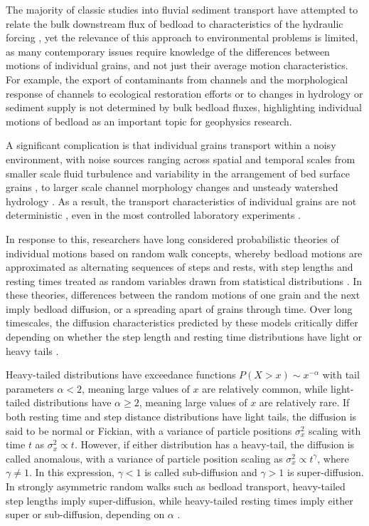 \documentclass[draft]{agujournal2018}
\begin{document}
The majority of classic studies into fluvial sediment transport have attempted to relate the bulk downstream flux of bedload to characteristics of the hydraulic forcing \citep[e.g.][]{Yalin1972}, yet the relevance of this approach to environmental problems is limited, as many contemporary issues require knowledge of the differences between motions of individual grains, and not just their average motion characteristics.
For example, the export of contaminants from channels \citep[e.g.][]{Malmon2005} and the morphological response of channels to ecological restoration efforts \citep[e.g.][]{Gaeuman2017} or to changes in hydrology or sediment supply \citep[e.g.][]{Hassan2017} is not determined by bulk bedload fluxes, highlighting individual motions of bedload as an important topic for geophysics research.

A significant complication is that individual grains transport within a noisy environment, with noise sources ranging across spatial and temporal scales from smaller scale fluid turbulence \citep{Celik2014} and variability in the arrangement of bed surface grains \citep{Gordon1972}, to larger scale channel morphology changes \citep{Hassan2017} and unsteady watershed hydrology \citep{Phillips2013}.
As a result, the transport characteristics of individual grains are not deterministic \citep[e.g.][]{Einstein1937}, even in the most controlled laboratory experiments \citep[e.g.][]{Charru2004, Bohm2004, Fathel2015, Heyman2016}.

In response to this, researchers have long considered probabilistic theories of individual motions based on random walk concepts, whereby bedload motions are approximated as alternating sequences of steps and rests, with step lengths and resting times treated as random variables drawn from statistical distributions \citep{Einstein1937, Yano1969, Nakagawa1976, Hassan1991, Bradley2012}.
In these theories, differences between the random motions of one grain and the next imply bedload diffusion, or a spreading apart of grains through time.
Over long timescales, the diffusion characteristics predicted by these models critically differ depending on whether the step length and resting time distributions have light or heavy tails \citep[e.g.][]{Bradley2017}.

Heavy-tailed distributions have exceedance functions $P(X>x) \sim x^{-\alpha}$ with tail parameters $\alpha < 2$, meaning large values of $x$ are relatively common, while light-tailed distributions have $\alpha \geq 2$, meaning large values of $x$ are relatively rare.
If both resting time and step distance distributions have light tails, the diffusion is said to be normal or Fickian, with a variance of particle positions $\sigma_x^2$
scaling with time $t$ as $\sigma_x^2 \propto t$.
However, if either distribution has a heavy-tail, the diffusion is called anomalous, with a variance of particle position scaling as $\sigma_x^2 \propto t^\gamma$, where $\gamma\neq 1$.
In this expression, $\gamma <1$ is called sub-diffusion and $\gamma > 1$ is super-diffusion.
In strongly asymmetric random walks such as bedload transport, heavy-tailed step lengths imply super-diffusion, while heavy-tailed resting times imply either super or sub-diffusion, depending on $\alpha$ \citep{Weeks1996, Weeks1998}.
\end{document}
